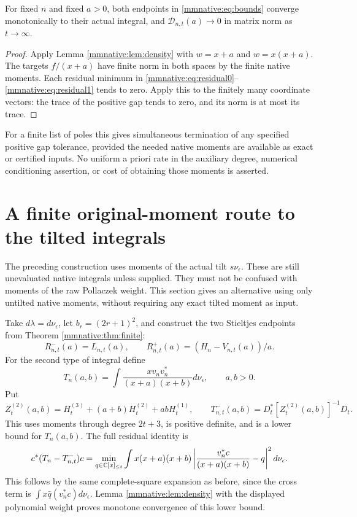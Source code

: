 \documentclass[11pt]{article}
\begin{document}
\begin{mmnativeproposition}\label{mmnative:prop:converge}
For fixed $n$ and fixed $a>0$, both endpoints in \eqref{mmnative:eq:bounds}
converge monotonically to their actual integral, and
$\mathcal D_{n,t}(a)\to0$ in matrix norm as $t\to\infty$.
\end{mmnativeproposition}
\begin{proof}
Apply Lemma \ref{mmnative:lem:density} with $w=x+a$ and $w=x(x+a)$.
The targets $f/(x+a)$ have finite norm in both spaces by the finite
native moments.  Each residual minimum in
\eqref{mmnative:eq:residual0}--\eqref{mmnative:eq:residual1} tends to zero.  Apply this
to the finitely many coordinate vectors: the trace of the positive
gap tends to zero, and its norm is at most its trace.
\end{proof}
For a finite list of poles this gives simultaneous termination of any
specified positive gap tolerance, provided the needed native moments
are available as exact or certified inputs.  No uniform a priori rate
in the auxiliary degree, numerical conditioning assertion, or cost of
obtaining those moments is asserted.

\section{A finite original-moment route to the tilted integrals}

The preceding construction uses moments of the actual tilt
$s\nu_\epsilon$.  These are still unevaluated native integrals unless
supplied.  They must not be confused with moments of the raw Pollaczek
weight.  This section gives an alternative using only untilted native
moments, without requiring any exact tilted moment as input.

Take $d\lambda=d\nu_\epsilon$, let $b_r=(2r+1)^2$, and construct
the two Stieltjes endpoints from Theorem \ref{mmnative:thm:finite}:
\[
 R_{n,t}^-(a)=L_{n,t}(a),\qquad
 R_{n,t}^+(a)=(H_n-V_{n,t}(a))/a.
\]
For the second type of integral define
\[
 T_n(a,b)=\int\frac{xv_nv_n^*}{(x+a)(x+b)}d\nu_\epsilon,
 \qquad a,b>0.
\]
Put
\begin{equation}\label{mmnative:eq:quadraticlower}
 Z_t^{(2)}(a,b)=H_t^{(3)}+(a+b)H_t^{(2)}+abH_t^{(1)},
 \qquad T_{n,t}^-(a,b)=D_t^*[Z_t^{(2)}(a,b)]^{-1}D_t.
\end{equation}
This uses moments through degree $2t+3$, is positive definite, and
is a lower bound for $T_n(a,b)$.  The full residual identity is
\begin{equation}\label{mmnative:eq:quadres}
 c^*(T_n-T_{n,t}^-)c
 =\min_{q\in\mathbb C[x]_{\le t}}
 \int x(x+a)(x+b)
 \left|\frac{v_n^*c}{(x+a)(x+b)}-q\right|^2d\nu_\epsilon.
\end{equation}
This follows by the same complete-square expansion as before, since
the cross term is $\int x\bar q(v_n^*c)d\nu_\epsilon$.
Lemma \ref{mmnative:lem:density} with the displayed polynomial weight proves
monotone convergence of this lower bound.
\end{document}
